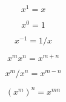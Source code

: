 
\[x^{1} = x\]

\[x^{0} = 1\]

\[x^{-1} = 1/x\]

\[x^{m}x^{n} = x^{m+n}\]

\[x^{m}/x^{n} = x^{m-n}\]

\[(x^{m})^{n} = x^{mn}\]

